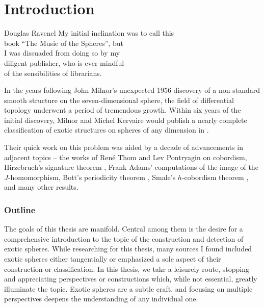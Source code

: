\chapter{Introduction}\label{chap:introduction}

\begin{epigraph}{17em}{Douglas Ravenel}
  My initial inclination was to call this\\
  book ``The Music of the Spheres'', but\\
  I was dissuaded from doing so by my \\
  diligent publisher, who is ever mindful \\
  of the sensibilities of librarians.
\end{epigraph}

In the years following John Milnor's unexpected 1956 discovery \cite{milnor1956manifolds} of a non-standard smooth structure on the seven-dimensional sphere, the field of differential topology underwent a period of tremendous growth. Within six years of the initial discovery, Milnor and Michel Kervaire would publish a nearly complete classification of exotic structures on spheres of any dimension in \cite{milnorkervaire1963groups}.


Their quick work on this problem was aided by a decade of advancements in adjacent topics -- the works of Ren\'e Thom \cite{thom1954} and Lev Pontryagin \cite{pontryagin1959homotopy} on cobordism, Hirzebruch's signature theorem \cite{hirzebruch1966methods}, Frank Adams' computations of the image of the $J$-homomorphism, Bott's periodicity theorem \cite{bott1959stable}, Smale's $h$-cobordism theorem \cite{smale1961generalized}, and many other results. 

\subsection*{Outline}

The goals of this thesis are manifold. Central among them is the desire for a comprehensive introduction to the topic of the construction and detection of exotic spheres. While researching for this thesis, many sources I found included exotic spheres either tangentially or emphasized a sole aspect of their construction or classification. In this thesis, we take a leisurely route, stopping and appreciating perspectives or constructions which, while not essential, greatly illuminate the topic. Exotic spheres are a subtle craft, and focusing on multiple perspectives deepens the understanding of any individual one. 
%



